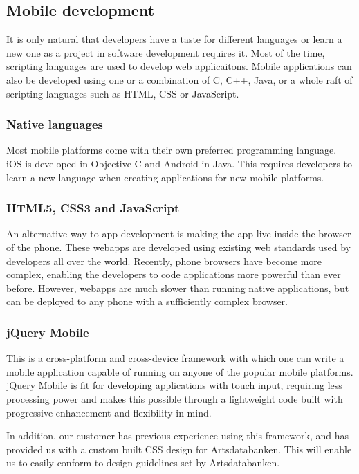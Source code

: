 \subsection{Mobile development}
It is only natural that developers have a taste for different languages or
learn a new one as a project in software development requires it. Most of the time,
scripting languages are used to develop web applicaitons. Mobile applications
can also be developed using one or a combination of C, C++, Java, or a whole raft of scripting languages such as HTML, CSS or JavaScript.

\subsubsection{Native languages}
Most mobile platforms come with their own preferred programming language. iOS is developed in Objective-C and Android in Java. This requires developers to learn a new language when creating applications for new mobile platforms.

\subsubsection{HTML5, CSS3 and JavaScript}
An alternative way to app development is making the app live inside the browser of the phone. These webapps are developed using existing web standards used by developers all over the world. Recently, phone browsers have become more complex, enabling the developers to code applications more powerful than ever before. However, webapps are much slower than running native applications, but can be deployed to any phone with a sufficiently complex browser\cite{phonegap:about}.

\subsubsection{jQuery Mobile}
This is a cross-platform and cross-device framework with which one can write
a mobile application capable of running on anyone of the popular mobile platforms.
jQuery Mobile is fit for developing applications with touch input, requiring
less processing power and  makes this possible through a lightweight code
built with progressive enhancement and flexibility in mind\cite{jquery:jq}.

In addition, our customer has previous experience using this framework, and has provided us with a custom built CSS design for Artsdatabanken. This will enable us to easily conform to design guidelines set by Artsdatabanken.

